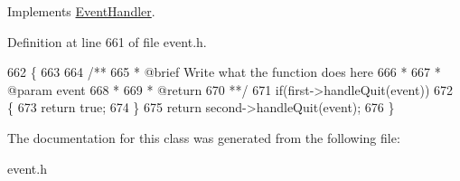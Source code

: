 Implements \hyperlink{structEventHandler}{Event\+Handler}.



Definition at line 661 of file event.\+h.


\begin{DoxyCode}
662         \{
663 \textcolor{comment}{}
664 \textcolor{comment}{            /**}
665 \textcolor{comment}{             * @brief Write what the function does here}
666 \textcolor{comment}{             *}
667 \textcolor{comment}{             * @param event}
668 \textcolor{comment}{             *}
669 \textcolor{comment}{             * @return}
670 \textcolor{comment}{             **/}
671             \textcolor{keywordflow}{if}(first->handleQuit(event))
672             \{
673                 \textcolor{keywordflow}{return} \textcolor{keyword}{true};
674             \}
675             \textcolor{keywordflow}{return} second->handleQuit(event);
676         \}
\end{DoxyCode}


The documentation for this class was generated from the following file\+:\begin{DoxyCompactItemize}
\item 
event.\+h\end{DoxyCompactItemize}
